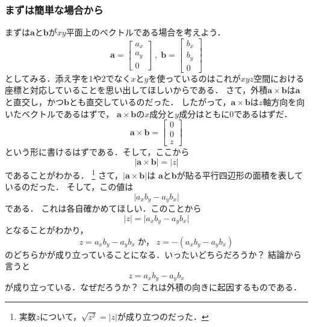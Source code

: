 \subsubsection{まずは簡単な場合から}
まずは$\bm{a}$と$\bm{b}$が$xy$平面上のベクトルである場合を考えよう．
$$
\bm{a} = \left[
 \begin{array}{c}
  a_x \\ 
  a_y \\
  0
 \end{array}
\right]
\; , \; 
\bm{b} = \left[
 \begin{array}{c}
  b_x \\ 
  b_y \\
  0
 \end{array}
\right]
$$
としてみる．添え字を1や2でなく$x$と$y$を使っているのはこれが$xyz$空間における座標と対応していることを思い出してほしいからである．
さて，外積$\bm{a} \times \bm{b}$は$\bm{a}$と直交し，かつ$\bm{b}$とも直交しているのだった．
したがって，$\bm{a} \times \bm{b}$は$z$軸方向を向いたベクトルであるはずで，
$\bm{a} \times \bm{b}$の$x$成分と$y$成分はともに0であるはずだ．
$$
\bm{a} \times \bm{b} = \left[
 \begin{array}{c}
  0 \\
  0 \\
  z
 \end{array}
\right]
$$
という形に書けるはずである．そして，ここから
$$
\lvert \bm{a} \times \bm{b} \rvert = \lvert z \rvert
$$
であることがわかる．
\footnote{実数$z$について，$\sqrt{z^2}=\lvert z \rvert$が成り立つのだった．}
さて，$\lvert \bm{a} \times \bm{b} \rvert$は
$\bm{a}$と$\bm{b}$が貼る平行四辺形の面積を表しているのだった．
そして，この値は
$$
\lvert a_x b_y - a_y b_x \rvert
$$
である． これは各自確かめてほしい．このことから
$$
\lvert z \rvert = \lvert a_x b_y - a_y b_x \rvert
$$
となることがわかり，
$$
z = a_x b_y - a_y b_x \; \text{か，} \; z = - ( a_x b_y - a_y b_x )
$$
のどちらかが成り立っていることになる．いったいどちらだろうか？ 結論から言うと
$$
z = a_ x b_y - a_y b_x
$$
が成り立っている．なぜだろうか？ これは外積の向きに起因するものである．

